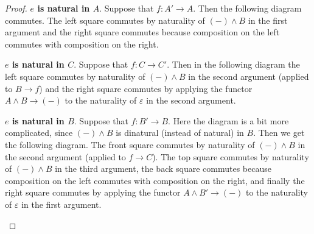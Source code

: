 \documentclass{article}
\newcommand{\pmap}{\to}
\renewcommand{\smash}{\wedge}
\renewcommand{\epsilon}{\varepsilon}
\begin{document}
\begin{proof}
\textbf{$e$ is natural in $A$}. Suppose that $f:A'\pmap A$. Then the following diagram commutes. The left square commutes by naturality of $({-})\smash B$ in the first argument and the right square commutes because composition on the left commutes with composition on the right.
\begin{center}
\end{center}

\textbf{$e$ is natural in $C$}. Suppose that $f:C\pmap C'$. Then in the following diagram the left square commutes by naturality of $({-})\smash B$ in the second argument (applied to $B\pmap f$) and the right square commutes by applying the functor $A\smash B \pmap({-})$ to the naturality of $\epsilon$ in the second argument.
\begin{center}
\end{center}

\textbf{$e$ is natural in $B$}. Suppose that $f:B'\pmap B$. Here the diagram is a bit more
complicated, since $({-})\smash B$ is dinatural (instead of natural) in $B$. Then we get the
following diagram. The front square commutes by naturality of $({-})\smash B$ in the second argument
(applied to $f\pmap C$). The top square commutes by naturality of $({-})\smash B$ in the third
argument, the back square commutes because composition on the left commutes with composition on the
right, and finally the right square commutes by applying the functor $A\smash B' \pmap({-})$ to the
naturality of $\epsilon$ in the first argument.
\begin{center}
\end{center}

\end{proof}
\end{document}
